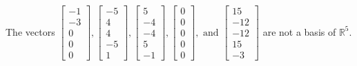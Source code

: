 \begin{exercise}
\begin{exerciseStatement}
  \end{exerciseStatement}
  \begin{exerciseAnswer}
   The vectors \(\left[\begin{array}{r}
-1 \\
-3 \\
0 \\
0 \\
0
\end{array}\right] , \left[\begin{array}{r}
-5 \\
4 \\
4 \\
-5 \\
1
\end{array}\right] , \left[\begin{array}{r}
5 \\
-4 \\
-4 \\
5 \\
-1
\end{array}\right] , \left[\begin{array}{r}
0 \\
0 \\
0 \\
0 \\
0
\end{array}\right] , \text{ and } \left[\begin{array}{r}
15 \\
-12 \\
-12 \\
15 \\
-3
\end{array}\right]\) 
  	 are not  a basis of \(\mathbb{R}^5\).
  


  \end{exerciseAnswer}
\end{exercise}